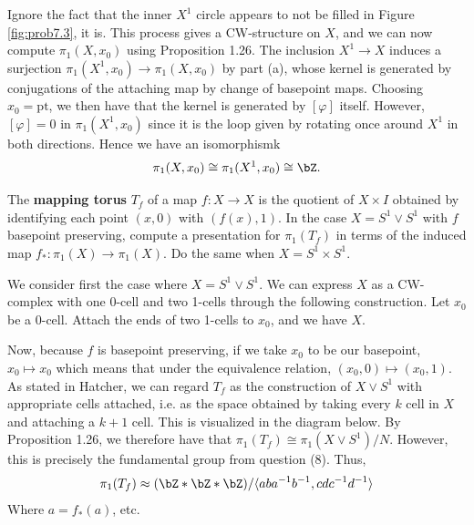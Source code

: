 \begin{homework}[e]
\begin{prf}
\begin{enumerate}
\begin{center}
          \label{fig:prob7.3}
        \end{center}
    \end{enumerate}
    Ignore the fact that the inner $X^1$ circle appears to not be filled in Figure \ref{fig:prob7.3}, it is. This process gives a CW-structure on $X$, and we can now compute $\pi_1(X,x_0)$ using Proposition 1.26. The inclusion $X^1 \to X$ induces a surjection $\pi_1(X^1,x_0) \to \pi_1(X,x_0)$ by part (a), whose kernel is generated by conjugations of the attaching map by change of basepoint maps. Choosing $x_0 = \text{pt}$, we then have that the kernel is generated by $[\varphi]$ itself. However, $[\varphi] = 0$ in $\pi_1(X^1,x_0)$ since it is the loop given by rotating once around $X^1$ in both directions. Hence we have an isomorphismk
    \begin{align*}
      \pi_1(X,x_0) \cong \pi_1(X^1,x_0) \cong \bZ.
    \end{align*}
  \end{prf}
   The \textbf{mapping torus} $T_f$ of a map $f:X \rightarrow X$ is the quotient of $X\times I$ obtained by identifying each point $(x,0)$ with $\left(f(x),1\right)$. In the case $X= S^1 \vee S^1$ with $f$ basepoint preserving, compute a presentation for $\pi_1(T_f)$ in terms of the induced map $f_*:\pi_1(X) \rightarrow \pi_1(X)$. Do the same when $X = S^1 \times S^1$.

\begin{prf}
    We consider first the case where $X = S^1 \vee S^1$. We can express $X$ as a CW-complex with one 0-cell and two 1-cells through the following construction. Let $x_0$ be a 0-cell. Attach the ends of two 1-cells to $x_0$, and we have $X$. 
    
    Now, because $f$ is basepoint preserving, if we take $x_0$ to be our basepoint, $x_0 \mapsto x_0$ which means that under the equivalence relation, $(x_0, 0) \mapsto (x_0, 1)$. As stated in Hatcher, we can regard $T_f$ as the construction of $X \vee S^1$ with appropriate cells attached, i.e. as the space obtained by taking every $k$ cell in $X$ and attaching a $k+1$ cell. This is visualized in the diagram below. By Proposition 1.26, we therefore have that $\pi_1(T_f) \cong \pi_1(X \vee S^1)/N$. However, this is precisely the fundamental group from question (8). Thus,
    \begin{equation*}
        \pi_1(T_f) \approx 
        (\bZ * \bZ * \bZ) / 
        \langle aba^{-1}b^{-1}, cdc^{-1}d^{-1} \rangle
    \end{equation*}
    Where $a = f_*(a)$, etc.
    

\end{prf}
\end{homework}
